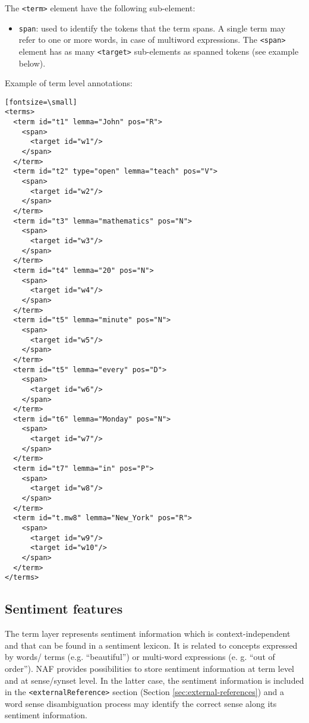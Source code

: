 The \texttt{<term>} element have the following sub-element:
\begin{itemize}
\item \texttt{span}: used to identify the tokens that the term spans. A
  single term may refer to one or more words, in case of multiword
  expressions. The \texttt{<span>} element has as many \texttt{<target>}
  sub-elements as spanned tokens (see example below).
\end{itemize}

Example of term level annotations:
\begin{verbatim}[fontsize=\small]
<terms>
  <term id="t1" lemma="John" pos="R">
    <span>
      <target id="w1"/>
    </span>
  </term>
  <term id="t2" type="open" lemma="teach" pos="V">
    <span>
      <target id="w2"/>
    </span>
  </term>
  <term id="t3" lemma="mathematics" pos="N">
    <span>
      <target id="w3"/>
    </span>
  </term>
  <term id="t4" lemma="20" pos="N">
    <span>
      <target id="w4"/>
    </span>
  </term>
  <term id="t5" lemma="minute" pos="N">
    <span>
      <target id="w5"/>
    </span>
  </term>
  <term id="t5" lemma="every" pos="D">
    <span>
      <target id="w6"/>
    </span>
  </term>
  <term id="t6" lemma="Monday" pos="N">
    <span>
      <target id="w7"/>
    </span>
  </term>
  <term id="t7" lemma="in" pos="P">
    <span>
      <target id="w8"/>
    </span>
  </term>
  <term id="t.mw8" lemma="New_York" pos="R">
    <span>
      <target id="w9"/>
      <target id="w10"/>
    </span>
  </term>
</terms>
\end{verbatim}


\subsection{Sentiment features}
\label{sec:sentiment-features}

The term layer represents sentiment information which is context-independent
and that can be found in a sentiment lexicon. It is related to concepts
expressed by words/ terms (e.g. ``beautiful'') or multi-word expressions
(e. g. ``out of order''). NAF provides possibilities to store sentiment
information at term level and at sense/synset level. In the latter case, the
sentiment information is included in the \texttt{<externalReference>}
section (Section \ref{sec:external-references}) and a word sense
disambiguation process may identify the correct sense along its sentiment
information. \\


